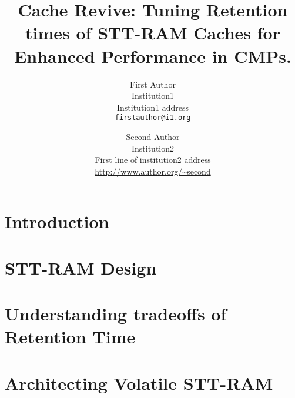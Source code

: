 \documentclass[12pt,letterpaper]{article}
\begin{document}
\title{Cache Revive: Tuning Retention times of STT-RAM Caches for Enhanced
Performance in CMPs.}

\author{First Author\\
Institution1\\
Institution1 address\\
{\tt\small firstauthor@i1.org}
\and
Second Author\\
Institution2\\
First line of institution2 address\\
{\small\url{http://www.author.org/~second}}
}

\maketitle

\begin{abstract}

\end{abstract}
\section{Introduction} \label{sec:intro}

\section{STT-RAM Design} \label{sec:design}

\section{Understanding tradeoffs of Retention Time} \label{sec:motivation}

\section{Architecting Volatile STT-RAM} \label{sec:implementation}

\end{document}
